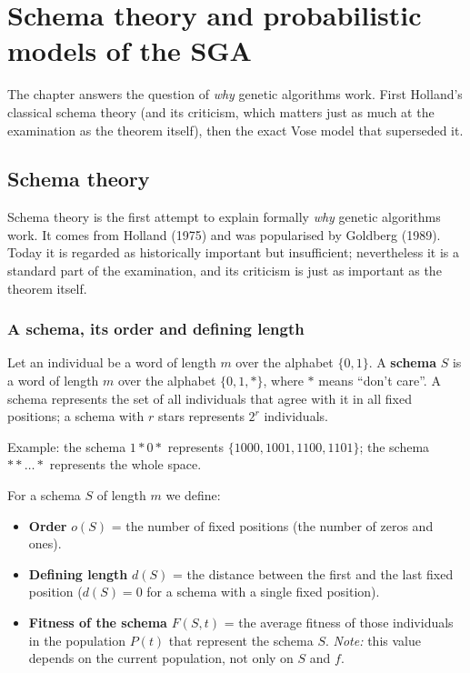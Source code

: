 \documentclass[11pt,a4paper]{article}
\theoremstyle{definition}
\providecommand{\uv}[1]{``#1''}
\begin{document}
\section{Schema theory and probabilistic models of the SGA}
\label{sec:schemata}

The chapter answers the question of \emph{why} genetic algorithms work. First Holland's
classical schema theory (and its criticism, which matters just as much at the examination as
the theorem itself), then the exact Vose model that superseded it.

\subsection{Schema theory}
\label{ssec:teorie-schemat}

Schema theory is the first attempt to explain formally \emph{why} genetic
algorithms work. It comes from Holland (1975) and was popularised by Goldberg
(1989). Today it is regarded as historically important but insufficient;
nevertheless it is a standard part of the examination, and its criticism is just
as important as the theorem itself.

\subsubsection{A schema, its order and defining length}

\begin{defbox}[Schema]
Let an individual be a word of length $m$ over the alphabet $\{0,1\}$. A
\textbf{schema} $S$ is a word of length $m$ over the alphabet $\{0,1,*\}$, where
$*$ means \uv{don't care}. A schema represents the set of all individuals that
agree with it in all fixed positions; a schema with $r$ stars represents $2^r$
individuals.
\end{defbox}

Example: the schema $1*0*$ represents $\{1000, 1001, 1100, 1101\}$; the schema
$**\ldots*$ represents the whole space.

\begin{defbox}
For a schema $S$ of length $m$ we define:
\begin{itemize}
\item \textbf{Order} $o(S)$ = the number of fixed positions (the number of zeros
  and ones).
\item \textbf{Defining length} $d(S)$ = the distance between the first and the
  last fixed position ($d(S) = 0$ for a schema with a single fixed position).
\item \textbf{Fitness of the schema} $F(S,t)$ = the average fitness of those
  individuals in the population $P(t)$ that represent the schema $S$.
  \emph{Note:} this value depends on the current population, not only on $S$
  and $f$.
\end{itemize}
\end{defbox}
\end{document}
